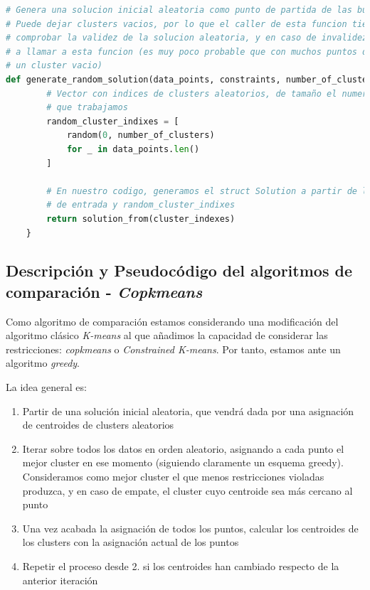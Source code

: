 \documentclass[11pt]{article}
\begin{document}
\begin{lstlisting}[language=Python, style=Boxed]
# Genera una solucion inicial aleatoria como punto de partida de las busquedas
# Puede dejar clusters vacios, por lo que el caller de esta funcion tiene que
# comprobar la validez de la solucion aleatoria, y en caso de invalidez, volver
# a llamar a esta funcion (es muy poco probable que con muchos puntos dejemos
# un cluster vacio)
def generate_random_solution(data_points, constraints, number_of_clusters):
        # Vector con indices de clusters aleatorios, de tamaño el numero de puntos
        # que trabajamos
        random_cluster_indixes = [
            random(0, number_of_clusters)
            for _ in data_points.len()
        ]

        # En nuestro codigo, generamos el struct Solution a partir de los parametros
        # de entrada y random_cluster_indixes
        return solution_from(cluster_indexes)
    }
\end{lstlisting}


\pagebreak

\subsection{Descripción y Pseudocódigo del algoritmos de comparación - \emph{Copkmeans}}

Como algoritmo de comparación estamos considerando una modificación del algoritmo clásico \emph{K-means} al que añadimos la capacidad de considerar las restricciones: \emph{copkmeans} o \emph{Constrained K-means}. Por tanto, estamos ante un algoritmo \emph{greedy}.

La idea general es:

\begin{enumerate}
    \item Partir de una solución inicial aleatoria, que vendrá dada por una asignación de centroides de clusters aleatorios
    \item Iterar sobre todos los datos en orden aleatorio, asignando a cada punto el mejor cluster en ese momento (siguiendo claramente un esquema greedy). Consideramos como mejor cluster el que menos restricciones violadas produzca, y en caso de empate, el cluster cuyo centroide sea más cercano al punto
    \item Una vez acabada la asignación de todos los puntos, calcular los centroides de los clusters con la asignación actual de los puntos
    \item Repetir el proceso desde 2. si los centroides han cambiado respecto de la anterior iteración
\end{enumerate}
\end{document}
